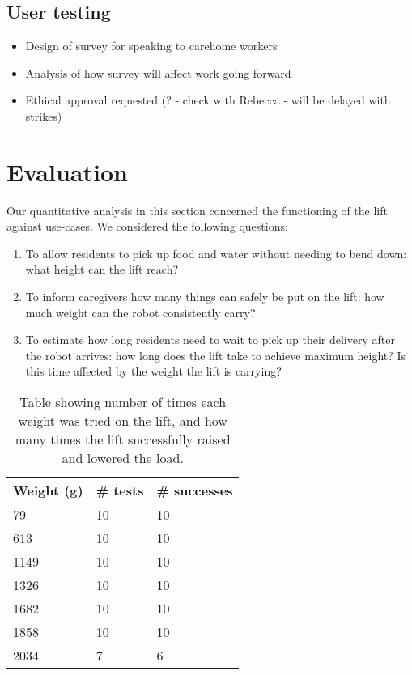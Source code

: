 \documentclass{article}
\begin{document}
\subsection{User testing}
\begin{itemize}
\item Design of survey for speaking to carehome workers
\item Analysis of how survey will affect work going forward
\item Ethical approval requested (? - check with Rebecca - will be delayed with strikes)
\end{itemize}

\section{Evaluation}
Our quantitative analysis in this section concerned the functioning of the lift against use-cases. We considered the following questions:
\begin{enumerate}
\item To allow residents to pick up food and water without needing to bend down: what height can the lift reach?
\item To inform caregivers how many things can safely be put on the lift: how much weight can the robot consistently carry?
\item To estimate how long residents need to wait to pick up their delivery after the robot arrives: how long does the lift take to achieve maximum height? Is this time affected by the weight the lift is carrying?
\end{enumerate}
\begin{table}
  \begin{center}
    \begin{tabular}{lll}
      {\bf Weight (g)} & {\bf \# tests} & {\bf \# successes} \\
      \hline
      79 &   10 & 10 \\
      613 &  10 & 10 \\
      1149 & 10 & 10 \\
      1326 & 10 & 10 \\
      1682 & 10 & 10 \\
      1858 & 10 & 10 \\
      2034 & 7 & 6
    \end{tabular}
    \caption{Table showing number of times each weight was tried on the lift, and how many times the lift successfully raised and lowered the load. }
    \label{tab:weight}
  \end{center}
\end{table}
\end{document}
